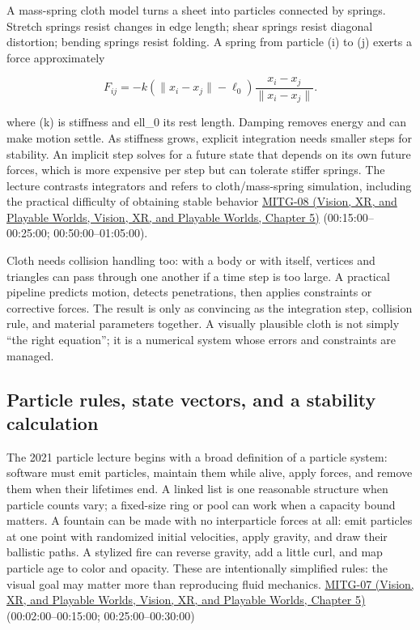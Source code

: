 A mass-spring cloth model turns a sheet into particles connected by springs. Stretch springs resist changes in edge length; shear springs resist diagonal distortion; bending springs resist folding. A spring from particle (i) to (j) exerts a force approximately

\[
F_{ij}=-k(\|x_i-x_j\|-\ell_0)\frac{x_i-x_j}{\|x_i-x_j\|}.
\]

where (k) is stiffness and ell\_0 its rest length. Damping removes energy and can make motion settle. As stiffness grows, explicit integration needs smaller steps for stability. An implicit step solves for a future state that depends on its own future forces, which is more expensive per step but can tolerate stiffer springs. The lecture contrasts integrators and refers to cloth/mass-spring simulation, including the practical difficulty of obtaining stable behavior \href{../07-Vision-XR-and-Playable-Worlds/main.pdf\#nameddest=04-visual-computing-ii-ch036-mitg-08---cloth-simulation}{MITG-08 (Vision, XR, and Playable Worlds, Vision, XR, and Playable Worlds, Chapter 5)} (00:15:00--00:25:00; 00:50:00--01:05:00).

Cloth needs collision handling too: with a body or with itself, vertices and triangles can pass through one another if a time step is too large. A practical pipeline predicts motion, detects penetrations, then applies constraints or corrective forces. The result is only as convincing as the integration step, collision rule, and material parameters together. A visually plausible cloth is not simply ``the right equation''; it is a numerical system whose errors and constraints are managed.

\subsection{Particle rules, state vectors, and a stability calculation}\label{04-visual-computing-ii-ch029-particle-rules-state-vectors-and-a-stability-calculation}

The 2021 particle lecture begins with a broad definition of a particle system: software must emit particles, maintain them while alive, apply forces, and remove them when their lifetimes end. A linked list is one reasonable structure when particle counts vary; a fixed-size ring or pool can work when a capacity bound matters. A fountain can be made with no interparticle forces at all: emit particles at one point with randomized initial velocities, apply gravity, and draw their ballistic paths. A stylized fire can reverse gravity, add a little curl, and map particle age to color and opacity. These are intentionally simplified rules: the visual goal may matter more than reproducing fluid mechanics. \href{../07-Vision-XR-and-Playable-Worlds/main.pdf\#nameddest=04-visual-computing-ii-ch036-mitg-07---particle-systems}{MITG-07 (Vision, XR, and Playable Worlds, Vision, XR, and Playable Worlds, Chapter 5)} (00:02:00--00:15:00; 00:25:00--00:30:00)

